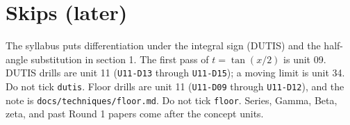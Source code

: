 \section{Skips (later)}
The syllabus puts differentiation under the integral sign (DUTIS) and the half-angle substitution in section 1. The first pass of $t=\tan(x/2)$ is unit 09. DUTIS drills are unit 11 (\texttt{U11-D13} through \texttt{U11-D15}); a moving limit is unit 34. Do not tick \texttt{dutis}. Floor drills are unit 11 (\texttt{U11-D09} through \texttt{U11-D12}), and the note is \texttt{docs/techniques/floor.md}. Do not tick \texttt{floor}. Series, Gamma, Beta, zeta, and past Round 1 papers come after the concept units.

